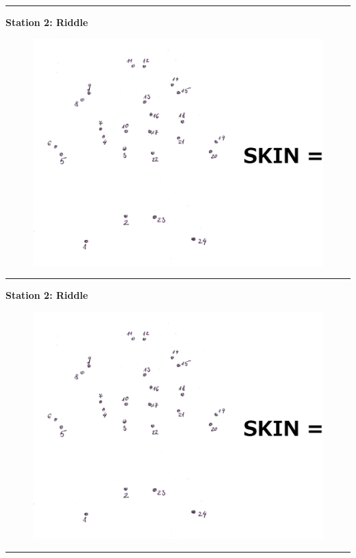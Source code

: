 \documentclass{article}
\begin{document}
\hrule
\vspace{3mm}

\textbf{Station 2: Riddle}
\vspace{4mm}

\begin{figure}[h]
  \includegraphics[width=145mm]{bark.eps}
\end{figure}
\vspace{3mm}

\hrule
\vspace{3mm}

\textbf{Station 2: Riddle}
\vspace{4mm}

\begin{figure}[h]
  \includegraphics[width=145mm]{bark.eps}
\end{figure}
\vspace{3mm}

\hrule
\end{document}
